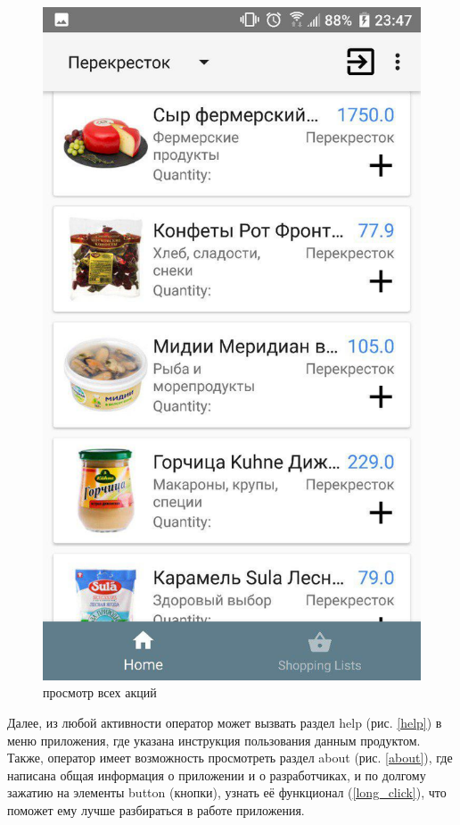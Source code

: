 \begin{figure}[h!]
    \centering
    \includegraphics[height=0.35\textheight]{./screenshots/3/home.jpg}
    \caption{\small{просмотр всех акций}}
    \label{home}
\end{figure}

Далее, из любой активности оператор может вызвать раздел help (рис. \ref{help})
в меню приложения, где указана инструкция пользования данным продуктом. Также,
оператор имеет возможность просмотреть раздел about (рис. \ref{about}), где
написана общая информация о приложении и о разработчиках, и по долгому зажатию
на элементы button (кнопки), узнать её функционал (\ref{long_click}), что поможет ему лучше
разбираться в работе приложения.

